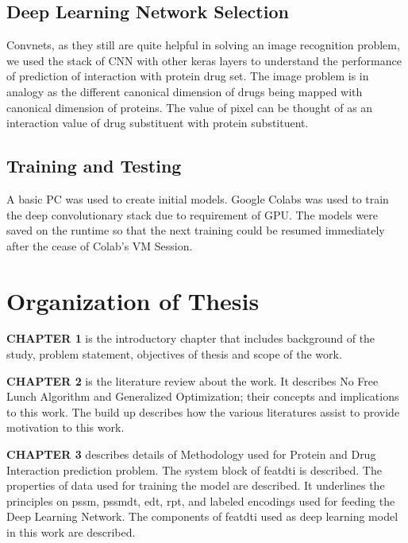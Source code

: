\iffalse
\subsection{Creating Analogy with Image}
For any protein sequence, instead of regarding them as segments, we try to run the whole protein sequence as an image: the residual contacts representing the pixels of the image.
\fi

\subsection{Deep Learning Network Selection}
Convnets, as they still are quite helpful in solving an image recognition problem, we used the stack of CNN with other keras layers to understand the performance of prediction of interaction with protein drug set. The image problem is in analogy as the different canonical dimension of drugs being mapped with canonical dimension of proteins. The value of pixel can be thought of as an interaction value of drug substituent with protein substituent.

\subsection{Training and Testing}
A basic PC was used to create initial models. Google Colabs was used to train the deep convolutionary stack due to requirement of GPU. The models were saved on the runtime so that the next training could be resumed immediately after the cease of Colab's VM Session.

\section{Organization of Thesis}

{{\uppercase{\bf{Chapter 1}}}
is the introductory chapter that includes background of the study, problem statement, objectives of thesis and scope of the work.
}

{{\uppercase{\bf{Chapter 2}}}
    is the literature review about the work. It describes No Free Lunch Algorithm and Generalized Optimization; their concepts and implications to this work. The build up describes how the various literatures assist to provide motivation to this work.
}

{{\uppercase{\bf{Chapter 3}}}
  describes details of Methodology used for Protein and Drug Interaction prediction problem. The system block of \acrfull{featdti} is described. The properties of data used for training the model are described. It underlines the principles on \acrfull{pssm}, \acrfull{pssmdt}, \acrfull{edt}, \acrfull{rpt}, and labeled encodings used for feeding the Deep Learning Network. The components of \acrfull{featdti} used as deep learning model in this work are described.
}

